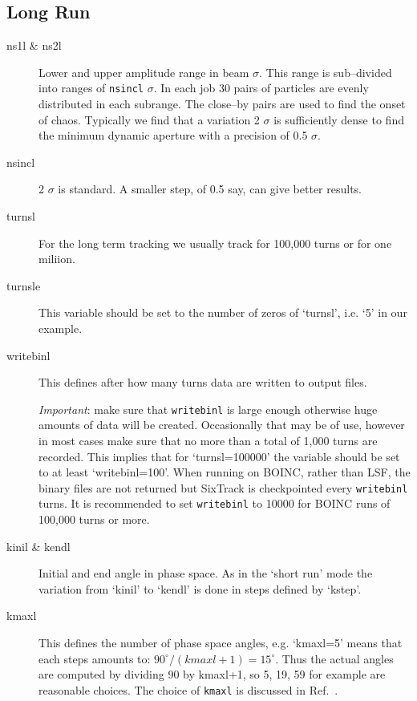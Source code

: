 \documentclass{article}    %
\begin{document}
\subsection{Long Run}
\label{sec:run_six:longrun}
\begin{description}
\item [ns1l \& ns2l]
  Lower and upper amplitude range in beam $\sigma$. This range is
  sub--divided into ranges of {\tt nsincl} $\sigma$. In each job 30 pairs of
  particles are evenly distributed in each subrange. The
  close--by pairs are used to find the onset of chaos. Typically we
  find that a variation 2 $\sigma$ is sufficiently dense to find the
  minimum dynamic aperture with a precision of 0.5 $\sigma$.
\item [nsincl] 2 $\sigma$ is standard. A smaller step, of 0.5 say, 
can give better results.
\item [turnsl]
  For the long term tracking we usually track for 100,000 turns or for
one miliion.
\item [turnsle]
  This variable should be set to the number of zeros of `turnsl',
  i.e. `5' in our example. 
\item [writebinl]
  This defines after how many turns data are written to output
  files.

  \emph{Important}: make sure that {\tt writebinl} is large enough
  otherwise huge amounts of data will be created. Occasionally that
  may be of use, however in most cases make sure that no more than a
  total of 1,000 turns are recorded. This implies that for
  `turnsl=100000' the variable should be set to at least `writebinl=100'.
  When running on BOINC, rather than LSF, the binary files are not returned
  but SixTrack is checkpointed every {\tt writebinl} turns. 
  It is recommended to set {\tt writebinl} to 10000 for BOINC runs 
of 100,000 turns or more.
\item[kinil \& kendl]
  Initial and end angle in phase space. As in the `short run' mode
  the variation from `kinil' to `kendl' is done in steps defined by
  `kstep'. 
\item [kmaxl]
  This defines the number of phase space angles, e.g. `kmaxl=5'
  means that each steps amounts to: $90^\circ/(kmaxl+1)=15^\circ$.
  Thus the actual angles are computed by dividing 90
  by kmaxl+1, so 5, 19, 59 for example are reasonable choices.
  The choice of {\tt kmaxl} is discussed in Ref.~\cite{fandmpaper}.
\end{description}
\end{document}
